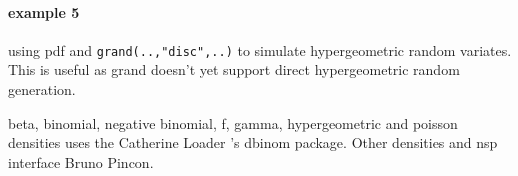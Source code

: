 \begin{examples}
\paragraph{example 5} using pdf and \verb+grand(..,"disc",..)+ to simulate
hypergeometric random variates. This is useful as grand doesn't yet
support direct hypergeometric random generation.
\begin{program}
\end{program}

\end{examples}



\begin{manseealso}
\end{manseealso}


\begin{authors}
  beta, binomial, negative binomial, f, gamma, hypergeometric and 
  poisson densities uses the Catherine Loader 's dbinom package. Other 
  densities and nsp interface Bruno Pincon.
\end{authors}

